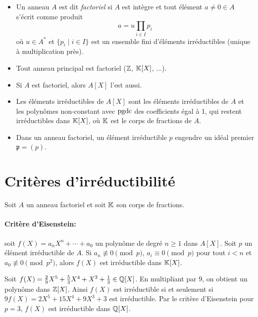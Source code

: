 \begin{itemize}
\item Un anneau $A$ est dit \emph{factoriel} si $A$ est intègre et tout élément $a \neq 0 \in A$ s'écrit comme
  produit 
  \[ a = u \prod_{i \in I} p_i \]
  où $u \in A^\ast$ et $\{p_i \mid i \in I\}$ est un ensemble fini d'éléments irréductibles (unique à
  multiplication près).

\item Tout anneau principal est factoriel ($\mathbb{Z}$, $\mathbb{K}[X]$, ...).

\item Si $A$ est factoriel, alors $A[X]$ l'est aussi.

\item Les éléments irréductibles de $A[X]$ sont les éléments irréductibles de $A$ et les polynômes
  non-constant avec $\mathrm{pgdc}$ des coefficients égal à 1, qui restent irréductibles dans $\mathbb{K}[X]$, où $\mathbb{K}$ est le
  corps de fractions de $A$.

\item Dans un anneau factoriel, un élément irréductible $p$ engendre un idéal premier $\mathfrak{p} = (p)$. 

\end{itemize}





\section{Critères d'irréductibilité}

Soit $A$ un anneau factoriel et soit $\mathbb{K}$ son corps de fractions. 

\paragraph{Critère d'Eisenstein:}

soit $f(X) = a_nX^n + \cdots + a_0$ un polynôme de degré $n \geq 1$ dans $A[X]$. Soit $p$ un
élément irréductible de $A$. Si $a_n \not \equiv 0 \pmod p$, $a_i \equiv 0 \pmod p$ pour tout $i < n$ et $a_0
\not \equiv 0 \pmod{p^2}$, alors $f(X)$ est irréductible dans $\mathbb{K}[X]$.

\begin{ex}
  Soit $f(X) = \frac{2}{9} X^5 + \frac{5}{3} X^4 + X^3 + \frac{1}{3} \in \mathbb{Q}[X]$. En multipliant par $9$, on
  obtient un polynôme dans $\mathbb{Z}[X]$. Ainsi $f(X)$ est irréductible si et seulement si $9f(X) = 2X^5 + 15X^4 +
  9X^3 + 3$ est irréductible. Par le critère d'Eisenstein pour $p = 3$, $f(X)$ est irréductible dans $\mathbb{Q}[X]$.
\end{ex}

